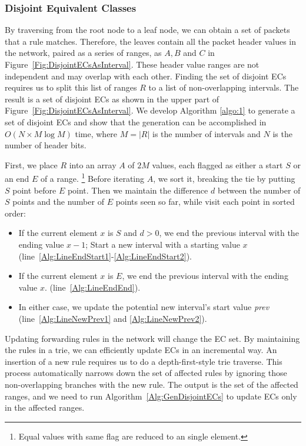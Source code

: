 
\subsubsection{Disjoint Equivalent Classes}
By traversing from the root node to a leaf node, we can obtain a set of packets that a rule matches.
Therefore, the leaves contain all the packet header values in the network, paired as a series of ranges, as $A, B$ and $C$ in Figure~\ref{Fig:DisjointECsAsInterval}.
These header value ranges are not independent and may overlap with each other.
Finding the set of disjoint ECs requires us to split this list of ranges $R$ to a list of non-overlapping intervals. The result is a set of disjoint ECs as shown in the upper part of Figure~\ref{Fig:DisjointECsAsInterval}. 
We develop Algorithm \ref{algo:1} to generate a set of disjoint ECs and show that the generation can be accomplished in $O(N \times M\log M)$ time,
where $M=|R|$ is the number of intervals and $N$ is the number of header bits.

First, we place $R$ into an array $A$ of $2M$ values,
each flagged as either a start $S$ or an end $E$ of a range.
\footnote{Equal values with same flag are reduced to an single element.}
Before iterating $A$, we sort it, breaking the tie by putting $S$ point before $E$ point.
Then we maintain the difference $d$ between the number of $S$ points and the number of $E$ points
seen so far, while visit each point in sorted order:
\begin{itemize}
\item If the current element $x$ is $S$ and $d > 0$,
        we end the previous interval with the ending value $x - 1$;
        Start a new interval with a starting value $x$
        (line~\ref{Alg:LineEndStart1}-\ref{Alg:LineEndStart2}).
\item If the current element $x$ is $E$, we end the previous interval with the ending value $x$.
        (line~\ref{Alg:LineEndEnd}).
\item In either case, we update the potential new interval's start value \textit{prev}
        (line~\ref{Alg:LineNewPrev1} and \ref{Alg:LineNewPrev2}).
\end{itemize}

Updating forwarding rules in the network will change the EC set.
By maintaining the rules in a trie, we can efficiently update ECs in an incremental way. An insertion of a new rule requires us to do a depth-first-style trie traverse. This process automatically narrows down the set of affected rules by ignoring those non-overlapping branches with the new rule.
The output is the set of the affected ranges, and we need to run Algorithm~\ref{Alg:GenDisjointECs} to update ECs only in the affected ranges.


